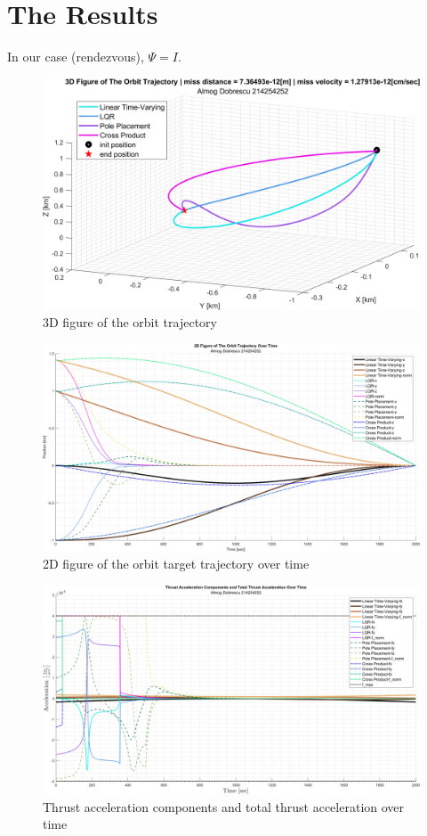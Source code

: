 \documentclass[11pt, a4paper]{article}
\begin{document}
\section{The Results}
In our case (rendezvous), $\Psi=I$. 
\begin{figure}[H]
    \centering
    \includegraphics[width=1\textwidth]{images/graph1.png}
    \caption{3D figure of the orbit trajectory}
    \label{fig:3D-plot}
\end{figure}
\begin{figure}[H]
    \centering
    \includegraphics[width=1\textwidth]{images/graph2.png}
    \caption{2D figure of the orbit target trajectory over time}
    \label{fig:2D-plot_over_time}
\end{figure}
\begin{figure}[H]
    \centering
    \includegraphics[width=1\textwidth]{images/graph3.png}
    \caption{Thrust acceleration components and total thrust acceleration over time}
    \label{fig:accel_over_time}
\end{figure}
\end{document}
